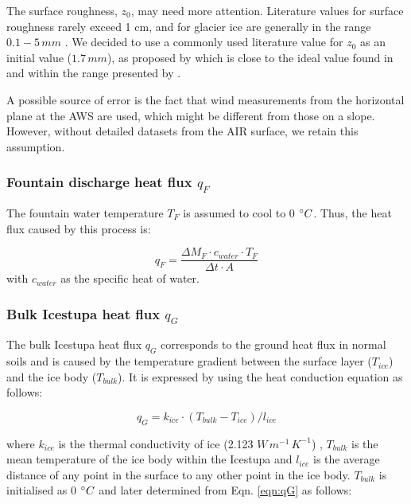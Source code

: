 \documentclass[utf8]{frontiersSCNS} %
\begin{document}
The surface roughness, $z_{0}$, may need more attention. Literature values for surface roughness rarely exceed 1 cm, and
for glacier ice are generally in the range $0.1-5\, mm$ \citet{BrockWillisSharp_2006}. We decided to use a commonly used
literature value for $z_{0}$ as an initial value ($1.7\,mm$), as proposed by \cite{CuffeyPaterson_2010} which is close to
the ideal value found in \cite{reid_brock_2014} and within the range presented by \cite{BrockWillisSharp_2006}.

A possible source of error is the fact that wind measurements from the horizontal plane at the AWS are used, which might
be different from those on a slope. However, without detailed datasets from the AIR surface, we retain this
assumption.

\subsubsection{Fountain discharge heat flux \texorpdfstring{$q_{F}$}{Lg} }
The fountain water temperature $T_F$ is assumed to cool to 0 $\degree C$. Thus, the heat flux caused by this
process is:

\begin{equation}
	q_{F} = \frac{ \Delta M_F \cdot c_{water} \cdot T_F}{\Delta t \cdot A}
	\label{eqn:qF}
\end{equation}
with $c_{water}$ as the specific heat of water.

\subsubsection{Bulk Icestupa heat flux \texorpdfstring{$q_{G}$}{Lg}} \label{sec:Bulkflux}
The bulk Icestupa heat flux $q_{G}$ corresponds to the ground heat flux in normal soils and is caused by the temperature
gradient between the surface layer ($T_{ice}$) and the ice body ($T_{bulk}$). It is expressed by using the heat
conduction equation as follows:

\begin{equation} q_{G} = k_{ice} \cdot (T_{bulk}-T_{ice})/l_{ice} \label{eqn:qG}    \end{equation}

where $k_{ice}$ is the thermal conductivity of ice (2.123 $W\, m^{-1}\,K^{-1}$) , $T_{bulk}$ is the mean temperature of
the ice body within the Icestupa and $l_{ice}$ is the average distance of any point in the surface to any other point in
the ice body. $T_{bulk}$ is initialised as 0 $\degree C$ and later determined from Eqn. \ref{eqn:qG} as follows:
\end{document}
